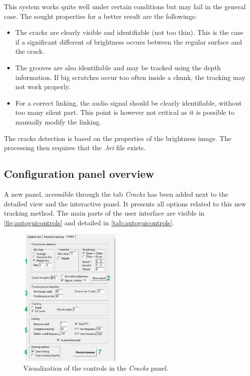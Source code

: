 This system works quite well under certain conditions but may fail in the general case. The sought properties for a better result are the followings:

\begin{itemize}
\item The cracks are clearly visible and identifiable (not too thin). This is the case if a significant different of brightness occurs between the regular surface and the crack.
\item The grooves are also identifiable and may be tracked using the depth information. If big scratches occur too often inside a chunk, the tracking may not work properly.
\item For a correct linking, the audio signal should be clearly identifiable, without too many silent part. This point is however not critical as it is possible to manually modify the linking.
\end{itemize}

The cracks detection is based on the properties of the brightness image. The processing then requires that the \emph{.bri} file exists.

\subsection{Configuration panel overview}

A new panel, accessible through the tab \emph{Cracks} has been added next to the detailed view and the interactive panel. It presents all options related to this new tracking method. The main parts of the user interface are visible in \autoref{fig:autoguicontrols} and detailed in \autoref{tab:autoguicontrols}.

\begin{figure}[!ht]
\centering
\includegraphics[width=0.45\textwidth]{images/auto-track-controls}
\caption{Visualization of the controls in the \emph{Cracks} panel.}
\label{fig:autoguicontrols}
\end{figure}

